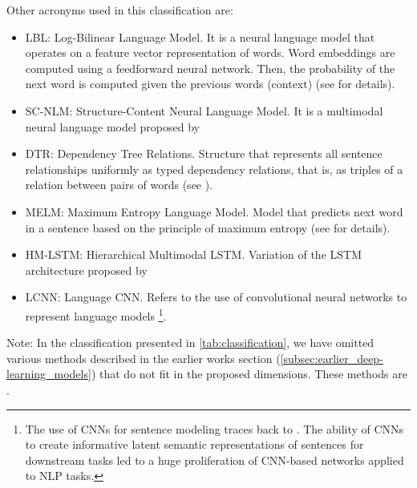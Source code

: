 Other acronyms used in this classification are:
\begin{itemize}
\item LBL: Log-Bilinear Language Model. It is a neural language model that operates on a feature vector representation of words. Word embeddings are computed using a feedforward neural network. Then, the probability of the next word is computed given the previous words (context) (see \citep{Mnih2007} for details).
\item SC-NLM: Structure-Content Neural Language Model. It is a multimodal neural language model proposed by \citep{Kiros2014_VS}
\item DTR: Dependency Tree Relations. Structure that represents all sentence relationships uniformly as typed dependency relations, that is, as triples of a relation between pairs of words (see \citep{DeMarneffe2006}).
\item MELM: Maximum Entropy Language Model. Model that predicts next word in a sentence based on the principle of maximum entropy (see \citep{Berger1996} for details).
\item HM-LSTM: Hierarchical Multimodal LSTM. Variation of the LSTM architecture proposed by \citet{Niu2017}
\item LCNN: Language CNN. Refers to the use of convolutional neural networks to represent language models \footnote{The use of CNNs for sentence modeling traces back to \citet{Collobert2008}. The ability of CNNs to create informative latent semantic representations of sentences for downstream tasks  \citet{Collobert2011,Kalchbrenner2014,Kim2014} led to a huge proliferation of CNN-based networks applied to NLP tasks.}. 
\end{itemize}

Note: In the classification presented in \cref{tab:classification}, we have omitted various methods described in the earlier works section (\cref{subsec:earlier_deep-learning_models}) that do not fit in the proposed dimensions. These methods are \citet{Socher2014, Lebret2015a, Lebret2015b, Yagcioglu2015}.

